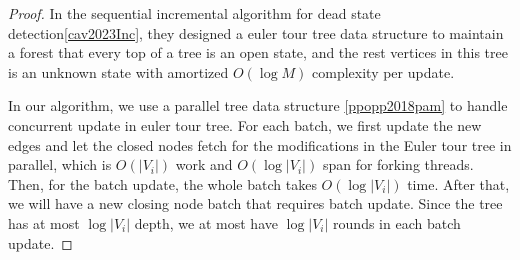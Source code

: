 \begin{proof}
    In the sequential incremental algorithm for dead state detection\ref{cav2023Inc},
    they designed a euler tour tree data structure to maintain a forest that every top of a tree
    is an open state, and the rest vertices in this tree is an unknown state with amortized $O(\log M)$ 
    complexity per update.

    In our algorithm, we use a parallel tree data structure \ref{ppopp2018pam}
    to handle concurrent update in euler tour tree. For each batch, we first update
    the new edges and let the closed nodes fetch for the modifications in the Euler tour tree
    in parallel, which is $O(|V_i|)$ work and $O(\log |V_i|)$ span for forking
    threads. Then, for the batch update, the whole batch takes $O(\log|V_i|)$ time.
    After that, we will have a new closing node batch that requires batch update.
    Since the tree has at most $\log|V_i|$ depth, we at most have $\log|V_i|$ rounds in each batch update.
    
\end{proof}
